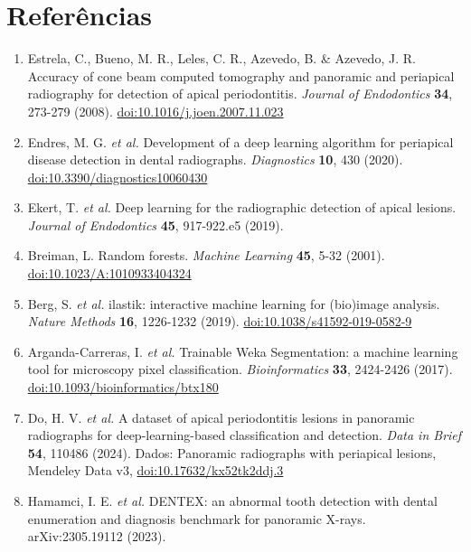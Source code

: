 \documentclass[twocolumn]{article}
\begin{document}
\balance
\section*{Referências}

{\sffamily\fontsize{7.8pt}{10.2pt}\selectfont
\begin{enumerate}[leftmargin=5mm,itemsep=1mm]
\item Estrela, C., Bueno, M. R., Leles, C. R., Azevedo, B. \& Azevedo, J. R. Accuracy of cone beam computed tomography and panoramic and periapical radiography for detection of apical periodontitis. \textit{Journal of Endodontics} \textbf{34}, 273-279 (2008). \href{https://doi.org/10.1016/j.joen.2007.11.023}{doi:10.1016/j.joen.2007.11.023}
\item Endres, M. G. \textit{et al.} Development of a deep learning algorithm for periapical disease detection in dental radiographs. \textit{Diagnostics} \textbf{10}, 430 (2020). \href{https://doi.org/10.3390/diagnostics10060430}{doi:10.3390/diagnostics10060430}
\item Ekert, T. \textit{et al.} Deep learning for the radiographic detection of apical lesions. \textit{Journal of Endodontics} \textbf{45}, 917-922.e5 (2019).
\item Breiman, L. Random forests. \textit{Machine Learning} \textbf{45}, 5-32 (2001). \href{https://doi.org/10.1023/A:1010933404324}{doi:10.1023/A:1010933404324}
\item Berg, S. \textit{et al.} ilastik: interactive machine learning for (bio)image analysis. \textit{Nature Methods} \textbf{16}, 1226-1232 (2019). \href{https://doi.org/10.1038/s41592-019-0582-9}{doi:10.1038/s41592-019-0582-9}
\item Arganda-Carreras, I. \textit{et al.} Trainable Weka Segmentation: a machine learning tool for microscopy pixel classification. \textit{Bioinformatics} \textbf{33}, 2424-2426 (2017). \href{https://doi.org/10.1093/bioinformatics/btx180}{doi:10.1093/bioinformatics/btx180}
\item Do, H. V. \textit{et al.} A dataset of apical periodontitis lesions in panoramic radiographs for deep-learning-based classification and detection. \textit{Data in Brief} \textbf{54}, 110486 (2024). Dados: Panoramic radiographs with periapical lesions, Mendeley Data v3, \href{https://doi.org/10.17632/kx52tk2ddj.3}{doi:10.17632/kx52tk2ddj.3}
\item Hamamci, I. E. \textit{et al.} DENTEX: an abnormal tooth detection with dental enumeration and diagnosis benchmark for panoramic X-rays. arXiv:2305.19112 (2023).

\end{enumerate}}
\end{document}
